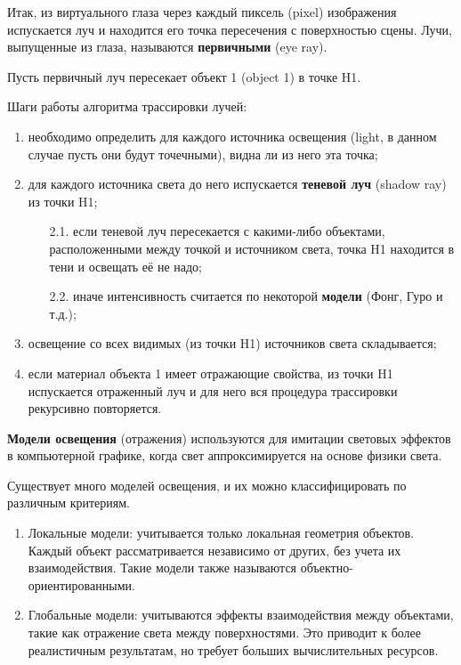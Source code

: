 \begin{enumerate}
Итак, из виртуального глаза через каждый пиксель (pixel) изображения испускается луч и находится его точка пересечения с поверхностью сцены. Лучи, выпущенные из глаза, называются \textbf{первичными} (eye ray).


\pagebreak

Пусть первичный луч пересекает объект 1 (object 1) в точке H1.

Шаги работы алгоритма трассировки лучей:
\begin{enumerate}
	\item необходимо определить для каждого источника освещения (light, в данном случае пусть они будут точечными), видна ли из него эта точка;
	\item для каждого источника света до него испускается \textbf{теневой луч} (shadow ray) из точки H1;
	\begin{enumerate}
		\item[2.1.] если теневой луч пересекается с какими-либо объектами, расположенными между точкой и источником света, точка H1 находится в тени и освещать её не надо;
		\item[2.2.] иначе интенсивность считается по некоторой \textbf{модели} (Фонг, Гуро и т.д.);
	\end{enumerate}
	\item освещение со всех видимых (из точки H1) источников света складывается;
	\item если материал объекта 1 имеет отражающие свойства, из точки H1 испускается отраженный луч и для него вся процедура трассировки рекурсивно повторяется.
\end{enumerate}

\textbf{Модели освещения} (отражения) используются для имитации световых эффектов в компьютерной графике, когда свет аппроксимируется на основе физики света.

Существует много моделей освещения, и их можно классифицировать по различным критериям.
\begin{enumerate}
	\item Локальные модели: учитывается только локальная геометрия объектов. Каждый объект рассматривается независимо от других, без учета их взаимодействия. Такие модели также называются объектно-ориентированными.

    \item Глобальные модели: учитываются эффекты взаимодействия между объектами, такие как отражение света между поверхностями. Это приводит к более реалистичным результатам, но требует больших вычислительных ресурсов.


\end{enumerate}
\end{enumerate}
